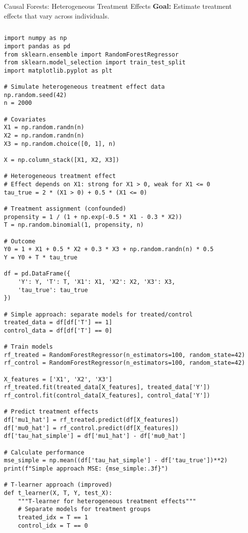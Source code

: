 \documentclass[aspectratio=169,11pt]{beamer}
\begin{document}
\begin{frame}[fragile]{Causal Forests: Heterogeneous Treatment Effects}
\textbf{Goal:} Estimate treatment effects that vary across individuals.

\begin{columns}
\begin{column}{0.55\textwidth}
\begin{lstlisting}[basicstyle=\ttfamily\tiny]
import numpy as np
import pandas as pd
from sklearn.ensemble import RandomForestRegressor
from sklearn.model_selection import train_test_split
import matplotlib.pyplot as plt

# Simulate heterogeneous treatment effect data
np.random.seed(42)
n = 2000

# Covariates
X1 = np.random.randn(n)
X2 = np.random.randn(n)
X3 = np.random.choice([0, 1], n)

X = np.column_stack([X1, X2, X3])

# Heterogeneous treatment effect
# Effect depends on X1: strong for X1 > 0, weak for X1 <= 0
tau_true = 2 * (X1 > 0) + 0.5 * (X1 <= 0)

# Treatment assignment (confounded)
propensity = 1 / (1 + np.exp(-0.5 * X1 - 0.3 * X2))
T = np.random.binomial(1, propensity, n)

# Outcome
Y0 = 1 + X1 + 0.5 * X2 + 0.3 * X3 + np.random.randn(n) * 0.5
Y = Y0 + T * tau_true

df = pd.DataFrame({
    'Y': Y, 'T': T, 'X1': X1, 'X2': X2, 'X3': X3,
    'tau_true': tau_true
})

# Simple approach: separate models for treated/control
treated_data = df[df['T'] == 1]
control_data = df[df['T'] == 0]

# Train models
rf_treated = RandomForestRegressor(n_estimators=100, random_state=42)
rf_control = RandomForestRegressor(n_estimators=100, random_state=42)

X_features = ['X1', 'X2', 'X3']
rf_treated.fit(treated_data[X_features], treated_data['Y'])
rf_control.fit(control_data[X_features], control_data['Y'])

# Predict treatment effects
df['mu1_hat'] = rf_treated.predict(df[X_features])
df['mu0_hat'] = rf_control.predict(df[X_features])
df['tau_hat_simple'] = df['mu1_hat'] - df['mu0_hat']

# Calculate performance
mse_simple = np.mean((df['tau_hat_simple'] - df['tau_true'])**2)
print(f"Simple approach MSE: {mse_simple:.3f}")

# T-learner approach (improved)
def t_learner(X, T, Y, test_X):
    """T-learner for heterogeneous treatment effects"""
    # Separate models for treatment groups
    treated_idx = T == 1
    control_idx = T == 0
    

\end{lstlisting}
\end{column}
\end{columns}
\end{frame}
\end{document}

